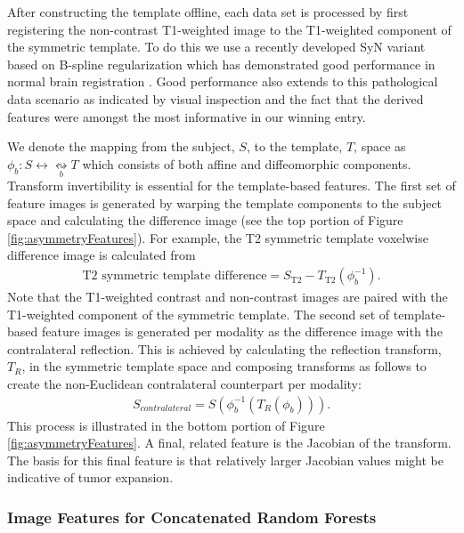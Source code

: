 \documentclass[preprint,authoryear,review,12pt]{elsarticle}
\begin{document}
After constructing the template offline, each data set is processed
by first registering the non-contrast T1-weighted image to the T1-weighted
component of the symmetric template.  To do this we use a recently developed 
SyN \citep{avants2011a} variant based on B-spline regularization 
which has demonstrated good performance in normal brain registration \citep{tustison2013a}.
Good performance also extends to this pathological data scenario as 
indicated by visual inspection and the fact that the derived features
were amongst the most informative in our winning entry.

We denote the mapping from the subject, $S$, to the template, $T$,
space as $\phi_b: S \leftrightarrow \underset{b}{\leftrightsquigarrow}  T$
which consists of both affine and diffeomorphic components.  Transform
invertibility is essential for the template-based features.  The first 
set of feature images is generated by warping the template components 
to the subject space and calculating the difference image (see the 
top portion of Figure \ref{fig:asymmetryFeatures}).  For example,
the T2 symmetric template voxelwise difference image is calculated from
\begin{align}
  \mathrm{T2}\,\,\mathrm{symmetric}\,\,\mathrm{template}\,\,\mathrm{difference} = S_{\mathrm{T2}} - T_{\mathrm{T2}}\left(\phi_b^{-1}\right).
\end{align}
Note that the T1-weighted contrast and non-contrast images are paired with
the T1-weighted component of the symmetric template.  The second
set of template-based feature images is generated per modality 
as the difference image with the contralateral reflection.  This is achieved by calculating the reflection transform, $T_R$, in the symmetric template space and composing transforms
as follows to create the non-Euclidean contralateral counterpart per modality:
\begin{align}
  S_{contralateral} = S\left( \phi_b^{-1}\left( T_R\left( \phi_b \right)\right)\right).
\end{align}
This process is illustrated in the bottom portion of Figure \ref{fig:asymmetryFeatures}. A final, related feature is the Jacobian
of the transform.  The basis for this final feature is that 
relatively larger Jacobian values might be indicative of tumor
expansion.


\subsubsection{Image Features for Concatenated Random Forests}
\end{document}
